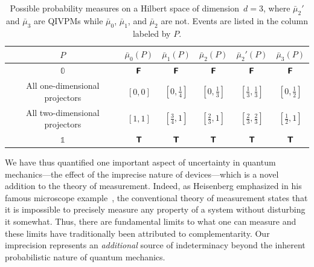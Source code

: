 \documentclass[english,reprint, aps, prl,superscriptaddress, showpacs,
showkeys, longbibliography, amsmath, amssymb, floatfix]{revtex4-1}
\theoremstyle{plain}
\theoremstyle{definition}
\newcommand{\interval}[1]{{\normalfont\textsf{\textbf{#1}}}}
\newcommand{\imposs}{\interval{F}}
\newcommand{\necess}{\interval{T}}
\newcommand{\says}[3]{\begin{framed}\begin{minipage}{0.9\linewidth}\color{#1}{#2 says: #3}\end{minipage}\end{framed}}
\newcommand{\andy}[1]{\says{blue}{Andy}{#1}}
\begin{document}
\begin{table}
\caption{\label{tab:probability-measures}Possible probability measures on
a Hilbert space of dimension~$d=3$, where $\bar{\mu}_{2}'$ and
$\bar{\mu}_{3}$ are QIVPMs while $\bar{\mu}_{0}$, $\bar{\mu}_{1}$,
and $\bar{\mu}_{2}$ are not. Events are listed in the column labeled
by $P$.}
\centering{}%
\begin{tabular}{cccccc}
\toprule 
\addlinespace
$P$  & $\bar{\mu}_{0}\left(P\right)$ & $\bar{\mu}_{1}\left(P\right)$ & $\bar{\mu}_{2}\left(P\right)$ & $\bar{\mu}_{2}'\left(P\right)$ & $\bar{\mu}_{3}\left(P\right)$\tabularnewline
\midrule
\midrule 
\addlinespace
$\mathbb{0}$  & $\imposs$ & $\imposs$ & $\imposs$ & $\imposs$ & $\imposs$\tabularnewline
\midrule 
\addlinespace
All one-dimensional projectors  & $\left[0,0\right]$ & $\left[0,\tfrac{1}{4}\right]$ & $\left[0,\tfrac{1}{3}\right]$ & $\left[\tfrac{1}{3},\tfrac{1}{3}\right]$ & $\left[0,\tfrac{1}{2}\right]$\tabularnewline
\midrule 
\addlinespace
All two-dimensional projectors  & $\left[1,1\right]$ & $\left[\tfrac{3}{4},1\right]$ & $\left[\tfrac{2}{3},1\right]$ & $\left[\tfrac{2}{3},\tfrac{2}{3}\right]$ & $\left[\tfrac{1}{2},1\right]$\tabularnewline
\midrule 
\addlinespace
$\mathbb{1}$  & $\necess$ & $\necess$ & $\necess$ & $\necess$ & $\necess$\tabularnewline
\bottomrule
\end{tabular}
\end{table}

We have thus quantified one important aspect of uncertainty in quantum
mechanics---the effect of the imprecise nature of devices---which is a novel
addition to the theory of measurement. Indeed, as Heisenberg
emphasized in his famous microscope
example~\cite{Heisenberg1983apsrev4}, the conventional theory
of measurement states that it is impossible to precisely measure any
property of a system without disturbing it somewhat. Thus, there are
fundamental limits to what one can measure and these limits have traditionally 
been attributed to complementarity. Our imprecision represents an 
\emph{additional} source of indeterminacy beyond the inherent probabilistic nature
of quantum mechanics.
\end{document}
